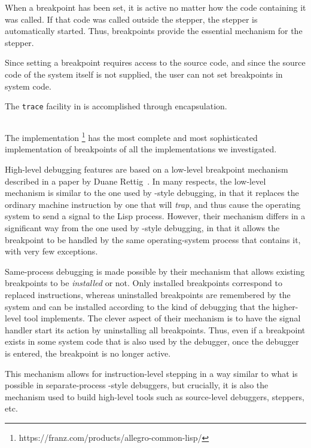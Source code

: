 When a breakpoint has been set, it is active no matter how the code
containing it was called.  If that code was called outside the
stepper, the stepper is automatically started.  Thus, breakpoints
provide the essential mechanism for the stepper.

Since setting a breakpoint requires access to the source code, and
since the source code of the system itself is not supplied, the user
can not set breakpoints in system code.

The \texttt{trace} facility in \lispworks{} is accomplished through
encapsulation.

\subsection{\allegro{}}

The \allegro{} \commonlisp{} implementation%
\footnote{https://franz.com/products/allegro-common-lisp/}
has the most complete and most sophisticated implementation of
breakpoints of all the \commonlisp{} implementations we investigated.

High-level debugging features are based on a low-level breakpoint
mechanism described in a paper by Duane
Rettig~\cite{Rettig:Instruction-level-breakpoints}.  In many respects,
the low-level mechanism is similar to the one used by \unix{}-style
debugging, in that it replaces the ordinary machine instruction by one
that will \emph{trap}, and thus cause the operating system to send a
signal to the Lisp process.  However, their mechanism differs in a
significant way from the one used by \unix{}-style debugging, in that
it allows the breakpoint to be handled by the same operating-system
process that contains it, with very few exceptions.

Same-process debugging is made possible by their mechanism that allows
existing breakpoints to be \emph{installed} or not.  Only installed
breakpoints correspond to replaced instructions, whereas uninstalled
breakpoints are remembered by the system and can be installed
according to the kind of debugging that the higher-level tool
implements.  The clever aspect of their mechanism is to have the
signal handler start its action by uninstalling all breakpoints.
Thus, even if a breakpoint exists in some system code that is also
used by the debugger, once the debugger is entered, the breakpoint is
no longer active.

This mechanism allows for instruction-level stepping in a way similar
to what is possible in separate-process \unix{}-style debuggers, but
crucially, it is also the mechanism used to build high-level tools
such as source-level debuggers, steppers, etc.
